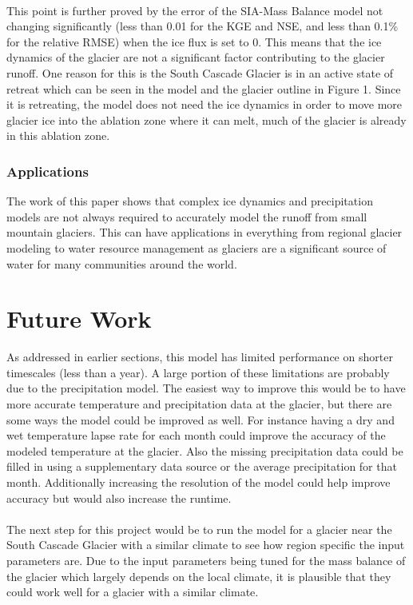 \documentclass{article}
\begin{document}
\paragraph{}
This point is further proved by the error of the SIA-Mass Balance model not changing significantly (less than 0.01 for the KGE and NSE, and less than 
0.1\% for the relative RMSE) when 
the ice flux is set to 0. This means that the ice dynamics of the glacier are not a significant factor contributing to the glacier runoff. One reason 
for this is the South Cascade Glacier is in an active state of retreat which can be seen in the model and the 
glacier outline in Figure 1. Since it is retreating, the model does not need the ice dynamics in order to move more glacier ice into the ablation zone 
where it can melt, much of the glacier is already in this ablation zone. 
\subsubsection{Applications}
The work of this paper shows that complex ice dynamics and precipitation models are not always required to accurately model the runoff from small mountain glaciers. This 
can have applications in everything from regional glacier modeling to water resource management as glaciers are a significant source of water 
for many communities around the world. 
\section{Future Work}
As addressed in earlier sections, this model has limited performance on shorter timescales (less than a year). A large portion of these limitations 
are probably due to the precipitation model. The easiest way to improve this would be to have more accurate temperature and precipitation data at the glacier, but 
there are some ways the model could be improved as well. For instance having a dry and wet temperature lapse rate for each month could improve the accuracy of the modeled 
temperature at the glacier. Also the missing precipitation data could be filled in using a supplementary data source or the average precipitation for that month.
Additionally increasing the resolution of the model could help improve accuracy but would also increase the runtime.
\paragraph{}
The next step for this project would be to run the model for a glacier near the South Cascade Glacier with a similar climate to see how region specific the input 
parameters are. Due to the input parameters being tuned for the mass balance of the glacier which largely depends on the local climate, it 
is plausible that they could work well for a glacier with a similar climate.
\end{document}
